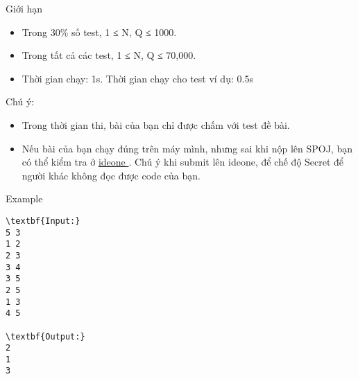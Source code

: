 Giới hạn  
\begin{itemize}
	\item     Trong 30\% số test, 1 ≤ N, Q ≤ 1000.   
	\item     Trong tất cả các test, 1 ≤ N, Q ≤ 70,000.   
	\item     Thời gian chạy: 1s. Thời gian chạy cho test ví dụ: 0.5s   
\end{itemize}
   Chú ý:  
\begin{itemize}
	\item     Trong thời gian thi, bài của bạn chỉ được chấm với test đề bài.   
	\item     Nếu bài của bạn chạy đúng trên máy mình, nhưng sai khi nộp lên SPOJ, bạn có thể kiểm tra ở    \href{https://ideone.com}{     ideone    }    . Chú ý khi submit lên ideone, để chế độ Secret để người khác không đọc được code của bạn.   
\end{itemize}
   Example  
\begin{verbatim}
\textbf{Input:}
5 3
1 2
2 3
3 4
3 5
2 5
1 3
4 5

\textbf{Output:}
2
1
3
\end{verbatim}